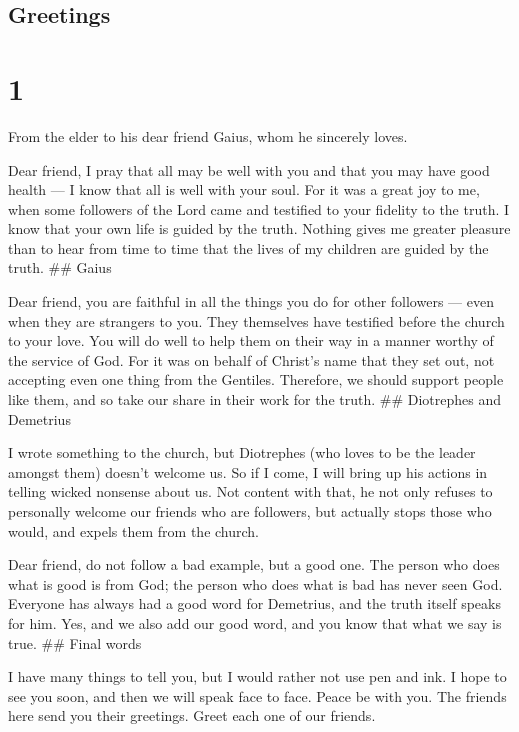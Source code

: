 \hypertarget{greetings}{%
\subsection{Greetings}\label{greetings}}

\hypertarget{section}{%
\section{1}\label{section}}

 From the elder to his dear friend Gaius, whom he sincerely
loves.

 Dear friend, I pray that all may be well with you and that
you may have good health --- I know that all is well with your soul.
 For it was a great joy to me, when some followers of the
Lord came and testified to your fidelity to the truth. I know that your
own life is guided by the truth.  Nothing gives me greater
pleasure than to hear from time to time that the lives of my children
are guided by the truth. \#\# Gaius

 Dear friend, you are faithful in all the things you do for
other followers --- even when they are strangers to you. 
They themselves have testified before the church to your love. You will
do well to help them on their way in a manner worthy of the service of
God.  For it was on behalf of Christ's name that they set
out, not accepting even one thing from the Gentiles. 
Therefore, we should support people like them, and so take our share in
their work for the truth. \#\# Diotrephes and Demetrius

 I wrote something to the church, but Diotrephes (who loves
to be the leader amongst them) doesn't welcome us.  So if I
come, I will bring up his actions in telling wicked nonsense about us.
Not content with that, he not only refuses to personally welcome our
friends who are followers, but actually stops those who would, and
expels them from the church.

 Dear friend, do not follow a bad example, but a good one.
The person who does what is good is from God; the person who does what
is bad has never seen God.  Everyone has always had a good
word for Demetrius, and the truth itself speaks for him. Yes, and we
also add our good word, and you know that what we say is true. \#\#
Final words

 I have many things to tell you, but I would rather not use
pen and ink.  I hope to see you soon, and then we will
speak face to face.  Peace be with you. The friends here
send you their greetings. Greet each one of our friends.
